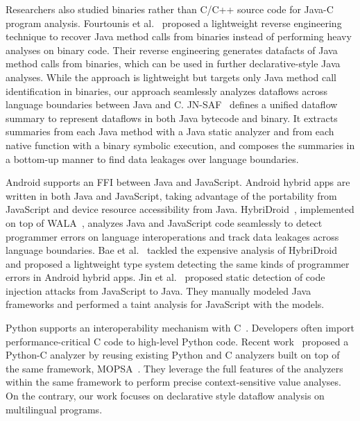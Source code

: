 Researchers also studied binaries rather than C/C++ source code
for Java-C program analysis. Fourtounis et al.~\cite{scanning} proposed a lightweight reverse engineering technique to
recover Java method calls from binaries instead of performing heavy analyses on
binary code.  Their reverse engineering generates datafacts of Java method
calls from binaries, which can be used in further declarative-style Java
analyses. While the approach is lightweight but targets only Java method call
identification in binaries, our approach seamlessly analyzes dataflows across language
boundaries between Java and C.  JN-SAF~\cite{JN-SAF} defines a
unified dataflow summary to represent dataflows in both Java bytecode and
binary.  It extracts summaries from each Java method with a Java static
analyzer and from each native function with a binary symbolic execution, and
composes the summaries in a bottom-up manner to find data leakages over
language boundaries.

Android supports an FFI between Java and JavaScript.  Android hybrid apps are
written in both Java and JavaScript, taking advantage of the portability from
JavaScript and device resource accessibility from Java.
HybriDroid~\cite{hybridroid}, implemented on top of WALA~\cite{WALA}, analyzes
Java and JavaScript code seamlessly to detect programmer errors on language
interoperations and track data leakages across language boundaries.
Bae et al.~\cite{BaeICSE19} tackled the expensive analysis of HybriDroid and proposed
a lightweight type system detecting the same kinds of programmer errors in
Android hybrid apps. Jin et al.~\cite{jin2014code} proposed static detection
of code injection attacks from JavaScript to Java.  They manually
modeled Java frameworks and performed a taint analysis for JavaScript with the models.


Python supports an interoperability mechanism with C~\cite{PythonC}.
Developers often import performance-critical C code to high-level Python code.
Recent work~\cite{sas2021} proposed a Python-C analyzer by reusing existing
Python and C analyzers built on top of the same framework, MOPSA~\cite{Mopsa}.
They leverage the full features of the analyzers within the same framework to
perform precise context-sensitive value analyses. 
On the contrary, our work focuses on declarative style dataflow analysis on
multilingual programs. 
